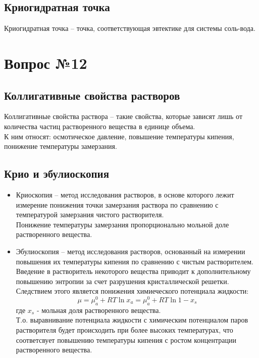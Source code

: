 \documentclass[14pt,a4paper]{scrartcl}
\begin{document}
\subsection*{Криогидратная точка}
Криогидратная точка -- точка, соответствующая эвтектике для системы соль-вода.



\section*{Вопрос №12}
\subsection*{Коллигативные свойства растворов}
Коллигативные свойства раствора -- такие свойства, которые зависят лишь от количества частиц растворенного вещества в единице объема. \\
К ним относят: осмотическое давление, повышение температуры кипения, понижение температуры замерзания.
\subsection*{Крио и эбулиоскопия}
\begin{itemize}
	\item Криоскопия -- метод исследования растворов, в основе которого лежит измерение понижения точки замерзания раствора по сравнению с температурой замерзания чистого растворителя. \\
	Понижение температуры замерзания пропорционально мольной доле растворенного вещества. \\
	\item Эбулиоскопия -- метод исследования растворов, основанный на измерении повышения их температуры кипения по сравнению с чистым растворителем. \\
	Введение в растворитель некоторого вещества приводит к дополнительному повышению энтропии за счет разрушения кристаллической решетки. Следствием этого является понижения химиеческого потенциала жидкости:
	$$ \mu = \mu_a^0 + RT \ln{x_a} = \mu_a^0 + RT \ln{1- x_s}   $$
	где $x_s$ - мольная доля растворенного вещества. \\
	Т.о. выравнивание потенциала жидкости с химическим потенциалом паров растворителя будет происходить при более высоких температурах, что соответсвует повышению температуры кипения с ростом концентрации растворенного вещества.
	
	
	
\end{itemize}
\end{document}

